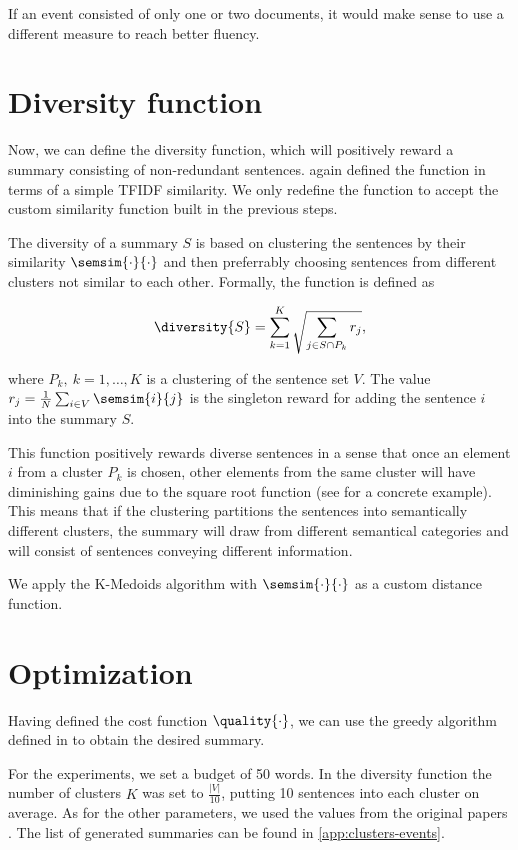If an event consisted of only one or two documents, it would make sense to use a different measure to reach better fluency.

\section{Diversity function}

Now, we can define the diversity function, which will positively reward a summary consisting of non-redundant sentences. \cite{multi-summarization-2} again defined the function in terms of a simple TFIDF similarity. We only redefine the function to accept the custom similarity function built in the previous steps.

The diversity of a summary $S$ is based on clustering the sentences by their similarity $\semsim{\cdot}{\cdot}$ and then preferrably choosing sentences from different clusters not similar to each other. Formally, the function is defined as

\begin{equation}
	\diversity{S} = \sum_{k = 1}^{K} \sqrt{\sum_{j \in S \cap P_{k}} r_{j}},
\end{equation}

where $P_{k},\ k = 1, \dots, K$ is a clustering of the sentence set $V$. The value $r_{j} = \frac{1}{N} \sum_{i \in V} \semsim{i}{j}$ is the singleton reward for adding the sentence $i$ into the summary $S$.

This function positively rewards diverse sentences in a sense that once an element $i$ from a cluster $P_{k}$ is chosen, other elements from the same cluster will have diminishing gains due to the square root function (see \cite{multi-summarization-2} for a concrete example). This means that if the clustering partitions the sentences into semantically different clusters, the summary will draw from different semantical categories and will consist of sentences conveying different information.

We apply the K-Medoids algorithm with $\semsim{\cdot}{\cdot}$ as a custom distance function.


\section{Optimization}
Having defined the cost function $\quality{\cdot}$, we can use the greedy algorithm defined in \cite{multi-summarization-1} to obtain the desired summary.

For the experiments, we set a budget of 50 words. In the diversity function the number of clusters $K$ was set to $\frac{\left| V \right|}{10}$, putting 10 sentences into each cluster on average. As for the other parameters, we used the values from the original papers \citep{multi-summarization-1, multi-summarization-2}. The list of generated summaries can be found in \autoref{app:clusters-events}.